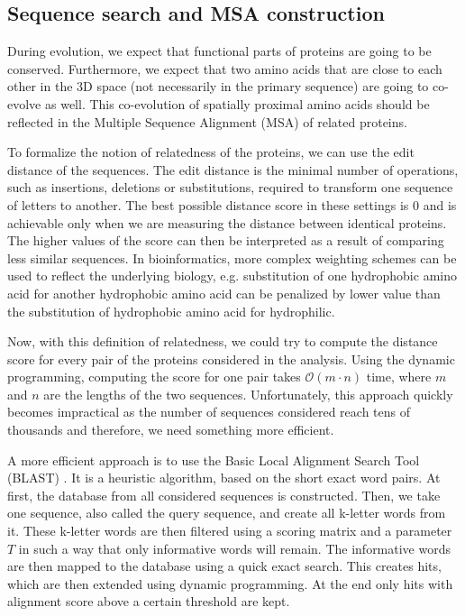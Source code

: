 \subsection{Sequence search and MSA construction}

During evolution, we expect that functional parts of proteins are going to be conserved. 
Furthermore, we expect that two amino acids that are close to each other in the 3D space (not necessarily in the primary sequence) are going to co-evolve as well. 
This co-evolution of spatially proximal amino acids should be reflected in the Multiple Sequence Alignment (MSA) of related proteins.

To formalize the notion of relatedness of the proteins, we can use the edit distance of the sequences.
The edit distance is the minimal number of operations, such as insertions, deletions or substitutions, required to transform one sequence of letters to another.
The best possible distance score in these settings is 0 and is achievable only when we are measuring the distance between identical proteins.
The higher values of the score can then be interpreted as a result of comparing less similar sequences.
In bioinformatics, more complex weighting schemes can be used to reflect the underlying biology, e.g. substitution of one hydrophobic amino acid for another hydrophobic amino acid can be penalized by lower value than the substitution of hydrophobic amino acid for hydrophilic. 

Now, with this definition of relatedness, we could try to compute the distance score for every pair of the proteins considered in the analysis.
Using the dynamic programming, computing the score for one pair takes $\mathcal{O}(m \cdot n)$ time, where $m$ and $n$ are the lengths of the two sequences.
Unfortunately, this approach quickly becomes impractical as the number of sequences considered reach tens of thousands and therefore, we need something more efficient.

A more efficient approach is to use the Basic Local Alignment Search Tool (BLAST) \cite{altschul1990basic}.
It is a heuristic algorithm, based on the short exact word pairs.
At first, the database from all considered sequences is constructed.
Then, we take one sequence, also called the query sequence, and create all k-letter words from it.
These k-letter words are then filtered using a scoring matrix and a parameter $T$ in such a way that only informative words will remain.
The informative words are then mapped to the database using a quick exact search.
This creates hits, which are then extended using dynamic programming.
At the end only hits with alignment score above a certain threshold are kept.

